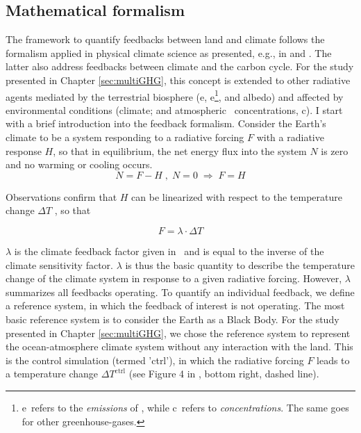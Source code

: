 \subsection{Mathematical formalism}
\label{sec:fbmaths}
 The framework to quantify feedbacks between land and climate follows the formalism applied in physical climate science as presented, e.g., in \citet{roe09annrev} and \citet{gregory09jclim}. The latter also address feedbacks between climate and the carbon cycle. For the study presented in Chapter \ref{sec:multiGHG}, this concept is  extended to other radiative agents mediated by the terrestrial biosphere (e\nno , e\chh\footnote{e\chh\ refers to the {\it emissions} of \chh , while c\chh\ refers to {\it concentrations}. The same goes for other greenhouse-gases.}, and albedo) and affected by environmental conditions (climate; and atmospheric \coo\ concentrations, c\coo ). I start with a brief introduction into the feedback formalism. Consider the Earth's climate to be a system responding to a radiative forcing $F$ with a radiative response $H$, so that in equilibrium, the net energy flux into the system $N$ is zero and no warming or cooling occurs.
 \begin{equation}
   N = F - H\;,\; N = 0 \; \Rightarrow \; F = H
 \end{equation}

Observations confirm that $H$ can be linearized with respect to the temperature change $\Delta T$ \citep{gregory09jclim}, so that

\begin{equation}
   F = \lambda \cdot \Delta T %
 \end{equation}

$\lambda$ is the climate feedback factor given in \wpmmpk\ and is equal to the inverse of the climate sensitivity factor. $\lambda$ is thus the basic quantity to describe the temperature change of the climate system in response to a given radiative forcing. However, $\lambda$ summarizes all feedbacks operating. To quantify an individual feedback, we define a reference system, in which the feedback of interest is not operating. The most basic reference system is to consider the Earth as a Black Body. For the study presented in Chapter \ref{sec:multiGHG}, we chose the reference system to represent the ocean-atmosphere climate system without any interaction with the land. This is the control simulation (termed 'ctrl'), in which the radiative forcing $F$ leads to a temperature change $\Delta T^{\text{ctrl}}$ (see Figure 4 in \citet{stocker13natcc}, bottom right, dashed line).

